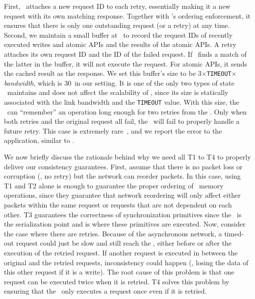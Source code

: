 First, \syslib\ attaches a new request ID to each retry, essentially making it a new request with its own matching response. Together with \syslib's ordering enforcement, it ensures that there is only one outstanding request (or a retry) at any time.
Second, we maintain a small buffer at \MN\ to record the request IDs of recently executed writes and atomic APIs and the results of the atomic APIs. A retry attaches its own request ID and the ID of the failed request. If \MN\ finds a match of the latter in the buffer, it will not execute the request. For atomic APIs, it sends the cached result as the response. We set this buffer's size to be 3$\times$\texttt{TIMEOUT}$\times$\textit{bandwidth}, which is 30\KB\ in our setting. It is one of the only two types of state \MN\ maintains and does not affect the scalability of \MN, since its size is statically associated with the link bandwidth and the \texttt{TIMEOUT} value.
With this size, the \MN\ can ``remember'' an operation long enough for two retries from the \CN. Only when both retries and the original request all fail, the \MN\ will fail to properly handle a future retry. This case is extremely rare~\cite{Homa}, and we report the error to the application, similar to \cite{Kalia14-RDMAKV,1RMA}.

We now briefly discuss the rationale behind why we need all T1 to T4 to properly deliver our consistency guarantees. 
First, assume that there is no packet loss or corruption (\ie, no retry) but the network can reorder packets. 
In this case, using T1 and T2 alone is enough to guarantee the proper ordering of \sys\ memory operations, since they guarantee that network reordering will only affect either packets within the same request or requests that are not dependent on each other.
T3 guarantees the correctness of synchronization primitives since the \MN\ is the serialization point and is where these primitives are executed.
Now, consider the case where there are retries.
Because of the asynchronous network, a timed-out request could just be slow and still reach the \MN, either before or after the execution of the retried request. If another request is executed in between the original and the retried requests, inconsistency could happen (\eg, losing the data of this other request if it is a write). The root cause of this problem is that one request can be executed twice when it is retried.
T4 solves this problem by ensuring that the \MN\ only executes a request once even if it is retried.


